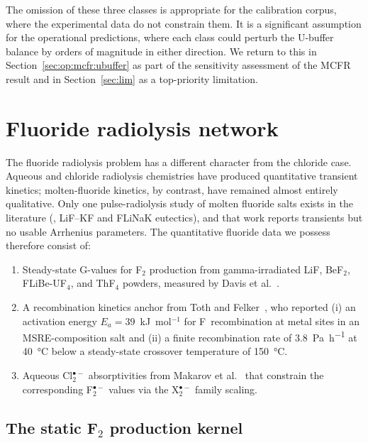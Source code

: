 \documentclass[11pt]{article}
\theoremstyle{plain}
\theoremstyle{definition}
\theoremstyle{remark}
\newcommand{\Ea}{E_a}
\begin{document}
The omission of these three classes is appropriate for the calibration
corpus, where the experimental data do not constrain them.  It is a
significant assumption for the operational predictions, where each class
could perturb the U-buffer balance by orders of magnitude in either
direction.  We return to this in Section~\ref{sec:op:mcfr:ubuffer} as
part of the sensitivity assessment of the MCFR result and in
Section~\ref{sec:lim} as a top-priority limitation.

\section{Fluoride radiolysis network}\label{sec:fluoride}

The fluoride radiolysis problem has a different character from the chloride
case.  Aqueous and chloride radiolysis chemistries have produced
quantitative transient kinetics; molten-fluoride kinetics, by contrast,
have remained almost entirely qualitative.  Only one pulse-radiolysis study
of molten fluoride salts exists in the literature
(\citealp{Akiyama1994}, LiF--KF and FLiNaK eutectics), and that work
reports transients but no usable Arrhenius parameters.  The quantitative
fluoride data we possess therefore consist of:

\begin{enumerate}
\item Steady-state G-values for F$_2$ production from gamma-irradiated
      LiF, BeF$_2$, FLiBe-UF$_4$, and ThF$_4$ powders, measured by Davis et
      al.~\citep{Davis2022}.
\item A recombination kinetics anchor from Toth and Felker~\citep{Toth1990},
      who reported (i) an activation energy $\Ea = 39$~kJ~mol$^{-1}$ for
      F~recombination at metal sites in an MSRE-composition salt and (ii) a
      finite recombination rate of \SI{3.8}{\pascal\per\hour} at
      \SI{40}{\celsius} below a steady-state crossover temperature of
      \SI{150}{\celsius}.
\item Aqueous Cl$_2^{\bullet-}$ absorptivities from Makarov et
      al.~\citep{Makarov1982} that constrain the corresponding F$_2^{\bullet-}$
      values via the X$_2^{\bullet-}$ family scaling.
\end{enumerate}

\subsection{The static F$_2$ production kernel}
\end{document}
